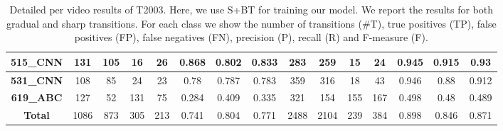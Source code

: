 \documentclass[journal]{IEEEtran}
\begin{document}
\begin{table*}[h]
\begin{tabular}{|c|c|c|c|c|c|c|c|c|c|c|c|c|c|c|}
\textbf{515\_CNN} & 131          & 105         & 16          & 26          & 0.868      & 0.802      & 0.833      & 283          & 259         & 15          & 24          & 0.945      & 0.915      & 0.93       \\ \hline
\textbf{531\_CNN} & 108          & 85          & 24          & 23          & 0.78       & 0.787      & 0.783      & 359          & 316         & 18          & 43          & 0.946      & 0.88       & 0.912      \\ \hline
\textbf{619\_ABC} & 127          & 52          & 131         & 75          & 0.284      & 0.409      & 0.335      & 321          & 154         & 155         & 167         & 0.498      & 0.48       & 0.489      \\ \hline
\textbf{Total}          & 1086         & 873         & 305         & 213         & 0.741      & 0.804      & 0.771      & 2488         & 2104        & 239         & 384         & 0.898      & 0.846      & 0.871      \\ \hline
\end{tabular}
\caption{Detailed per video results of T2003. Here, we use S+BT for training our model. We report the results for both gradual and sharp transitions. For each class we show the number of transitions (\#T), true positives (TP), false positives (FP), false negatives (FN), precision (P), recall (R) and F-measure (F).}
\label{2003_01}
\end{table*}
\end{document}
